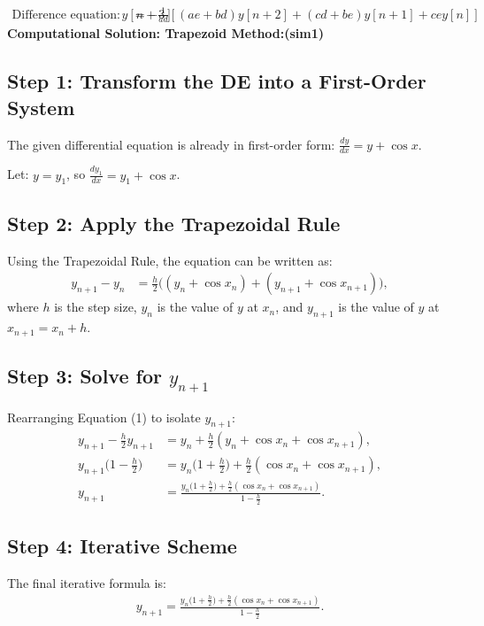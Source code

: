 \documentclass[journal]{IEEEtran}
\begin{document}
	\begin{align}
		\text{Difference equation: } 
		y[n+3] &= -\frac{1}{ad} \left[(ae+bd)y[n+2] + (cd+be)y[n+1] + cey[n]\right]
	\end{align}
	\textbf{Computational Solution: Trapezoid Method:(sim1)}
	
	\subsection*{Step 1: Transform the DE into a First-Order System}
	
	The given differential equation is already in first-order form:
	$\frac{dy}{dx} = y + \cos x$.
	
	Let:
	$y = y_1$, so $\frac{dy_1}{dx} = y_1 + \cos x$.
	
	\subsection*{Step 2: Apply the Trapezoidal Rule}
	
	Using the Trapezoidal Rule, the equation can be written as:
	\begin{align}
		y_{n+1} - y_n &= \frac{h}{2} \big( (y_n + \cos x_n) + (y_{n+1} + \cos x_{n+1}) \big),
	\end{align}
	where $h$ is the step size, $y_n$ is the value of $y$ at $x_n$, and $y_{n+1}$ is the value of $y$ at $x_{n+1} = x_n + h$.
	
	\subsection*{Step 3: Solve for $y_{n+1}$}
	
	Rearranging Equation (1) to isolate $y_{n+1}$:
	\begin{align}
		y_{n+1} - \frac{h}{2} y_{n+1} &= y_n + \frac{h}{2} (y_n + \cos x_n + \cos x_{n+1}), \\
		y_{n+1} \big( 1 - \frac{h}{2} \big) &= y_n \big( 1 + \frac{h}{2} \big) + \frac{h}{2} (\cos x_n + \cos x_{n+1}), \\
		y_{n+1} &= \frac{y_n \big( 1 + \frac{h}{2} \big) + \frac{h}{2} (\cos x_n + \cos x_{n+1})}{1 - \frac{h}{2}}.
	\end{align}
	
	\subsection*{Step 4: Iterative Scheme}
	
	The final iterative formula is:
	\begin{align}
		y_{n+1} = \frac{y_n \big( 1 + \frac{h}{2} \big) + \frac{h}{2} (\cos x_n + \cos x_{n+1})}{1 - \frac{h}{2}}.
	\end{align}
	
\end{document}
